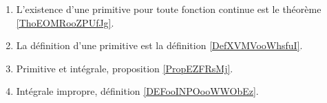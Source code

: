 
\begin{enumerate}
    \item
        L'existence d'une primitive pour toute fonction continue est le théorème \ref{ThoEOMRooZPUfJg}.
    \item
        La définition d'une primitive est la définition \ref{DefXVMVooWhsfuI}.
    \item
        Primitive et intégrale, proposition \ref{PropEZFRsMj}.
    \item
        Intégrale impropre, définition \ref{DEFooINPOooWWObEz}.
\end{enumerate}

